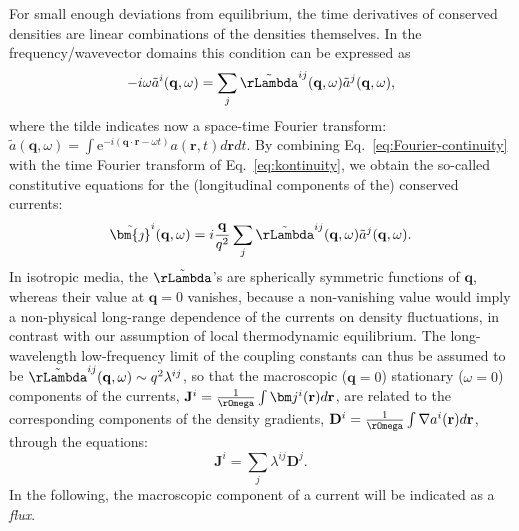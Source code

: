 For small enough deviations from equilibrium, the time derivatives of conserved densities are linear combinations of the densities themselves. In the frequency/wavevector domains this condition can be expressed as
\begin{equation}
  -i\omega\tilde a^i(\mathbf{q},\omega) = \sum_j \tilde\rLambda^{ij}(\mathbf{q},\omega) \tilde a^j(\mathbf{q},\omega), \label{eq:Fourier-continuity}
\end{equation}
where the tilde indicates now a space-time Fourier transform: $\tilde a(\mathbf{q},\omega) = \int \mathrm{e}^{-i(\mathbf{q}\cdot \mathbf{r}-\omega t)} a(\mathbf{r},t)d\mathbf{r}dt $. By combining Eq.~\eqref{eq:Fourier-continuity} with the time Fourier transform of Eq.~\eqref{eq:kontinuity}, we obtain the so-called constitutive equations for the (longitudinal components of the) conserved currents:
\begin{equation}
  \tilde{\bm{\jmath}}^i(\mathbf{q},\omega)=i\frac{\mathbf{q}}{q^2} \sum_j\tilde \rLambda^{ij}(\mathbf{q},\omega)\tilde a^j(\mathbf{q},\omega). \label{eq:constitutive-qomega}
\end{equation}
In isotropic media, the $\tilde\rLambda$'s are spherically symmetric functions of $\mathbf{q}$, whereas their value at $\mathbf{q}=0$ vanishes, because a non-vanishing value would imply a non-physical long-range dependence of the currents on density fluctuations, in contrast with our assumption of local thermodynamic equilibrium. The long-wavelength low-frequency limit of the coupling constants can thus be assumed to be $\tilde\rLambda^{ij}(\mathbf{q},\omega) \sim q^2 \lambda^{ij}$, so that the macroscopic ($\mathbf{q}=0$) stationary ($\omega=0$) components of the currents, $\mathbf{J}^i = \frac{1}{\rOmega} \int\bm j^i (\mathbf{r}) d\mathbf{r}$, are related to the corresponding components of the density gradients, $\mathbf{D}^i=\frac{1}{\rOmega}\int\nabla a^i(\mathbf{r})d\mathbf{r}$, through the equations:
\begin{equation}
  \mathbf{J}^i=\sum_j \lambda^{ij}\mathbf{D}^j. \label{eq:constitutive}
\end{equation}
In the following, the macroscopic component of a current will be indicated as a \emph{flux}.

